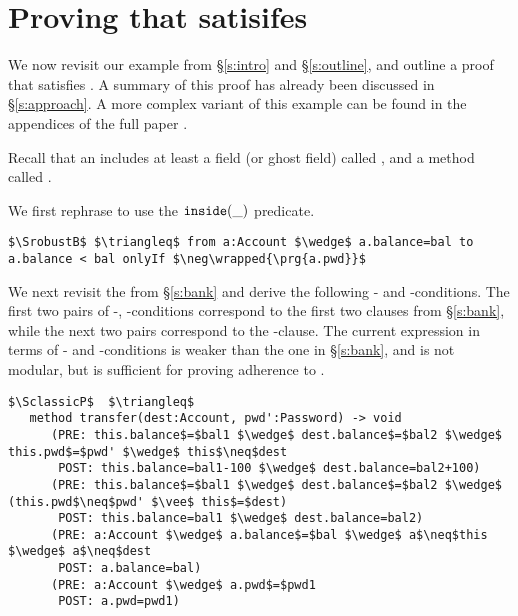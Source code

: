 \section{Proving that \ModC satisifes \SrobustB}
\label{s:examples}
We now revisit our example from  \S  \ref{s:intro} and \S \ref{s:outline},
and outline a proof that \ModC satisfies \SrobustB. 
A {summary} of this proof has already been discussed in \S \ref{s:approach}.
 A more complex variant of this example can be found in the appendices of the full paper \cite{necessityFull}. %
  
 
 
Recall that an  includes %
 at least a  field  (or ghost field)  called , and a method called . 

%
 We first rephrase 
\SrobustB to use the $\texttt{inside}( \_ )$ predicate.
\begin{lstlisting}[language=Chainmail, mathescape=true, frame=lines]
$\SrobustB$ $\triangleq$ from a:Account $\wedge$ a.balance=bal to a.balance < bal onlyIf $\neg\wrapped{\prg{a.pwd}}$
\end{lstlisting}

We next revisit the   \funcSpec from \S \ref{s:bank} and derive the following 
- and -conditions. The first two pairs of -, -conditions correspond to the first two 
clauses from \S \ref{s:bank}, while the next two pairs correspond to the -clause. The current expression in terms
of - and -conditions is weaker than the one in \S \ref{s:bank}, and is not modular, but is
sufficient for proving adherence to  \SrobustB.

\begin{lstlisting}[mathescape=true, frame=lines, language=Chainmail]
$\SclassicP$  $\triangleq$
   method transfer(dest:Account, pwd':Password) -> void  
      (PRE: this.balance$=$bal1 $\wedge$ dest.balance$=$bal2 $\wedge$ this.pwd$=$pwd' $\wedge$ this$\neq$dest
       POST: this.balance=bal1-100 $\wedge$ dest.balance=bal2+100)
      (PRE: this.balance$=$bal1 $\wedge$ dest.balance$=$bal2 $\wedge$ (this.pwd$\neq$pwd' $\vee$ this$=$dest)
       POST: this.balance=bal1 $\wedge$ dest.balance=bal2)
      (PRE: a:Account $\wedge$ a.balance$=$bal $\wedge$ a$\neq$this $\wedge$ a$\neq$dest 
       POST: a.balance=bal)          
      (PRE: a:Account $\wedge$ a.pwd$=$pwd1  
       POST: a.pwd=pwd1)         
\end{lstlisting}


